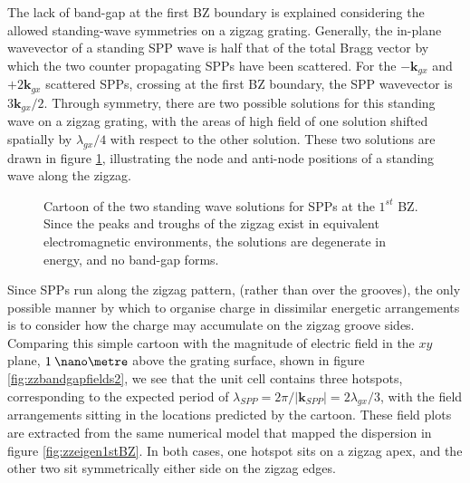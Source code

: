 The lack of band-gap at the first BZ boundary is explained considering the allowed standing-wave symmetries on a zigzag grating. Generally, the in-plane wavevector of a standing SPP wave is half that of the total Bragg vector by which the two counter propagating SPPs have been scattered. For the $-\mathbf{k}_{gx}$ and $+2\mathbf{k}_{gx}$ scattered SPPs, crossing at the first BZ boundary, the SPP wavevector is $3\mathbf{k}_{gx}/2$. Through symmetry, there are two possible solutions for this standing wave on a zigzag grating, with the areas of high field of one solution shifted spatially by $\lambda_{gx}/4$ with respect to the other solution. These two solutions are drawn in figure \ref{fig:zzbandgapcartoon}, illustrating the node and anti-node positions of a standing wave along the zigzag. 
\begin{figure}
\begin{center}
\subfigure[]{}
\subfigure[]{}		
	\end{center}	
\caption[Cartoon of the two standing wave solutions for SPPs at the $1^{st}$ BZ.]{Cartoon of the two standing wave solutions for SPPs at the $1^{st}$ BZ. Since the peaks and troughs of the zigzag exist in equivalent electromagnetic environments, the solutions are degenerate in energy, and no band-gap forms. \label{fig:zzbandgapcartoon}}
\end{figure}
Since SPPs run along the zigzag pattern, (rather than over the grooves), the only possible manner by which to organise charge in dissimilar energetic arrangements is to consider how the charge may accumulate on the zigzag groove sides. Comparing this simple cartoon with the magnitude of electric field in the $xy$ plane, $1\:\nano\metre$ above the grating surface, shown in figure \ref{fig:zzbandgapfields2}, we see that the unit cell contains three hotspots, corresponding to the expected period of $\lambda_{SPP}=2\pi/|\mathbf{k}_{SPP}|=2\lambda_{gx}/3$, with the field arrangements sitting in the locations predicted by the cartoon. These field plots are extracted from the same numerical model that mapped the dispersion in figure \ref{fig:zzeigen1stBZ}. In both cases, one hotspot sits on a zigzag apex, and the other two sit symmetrically either side on the zigzag edges.
